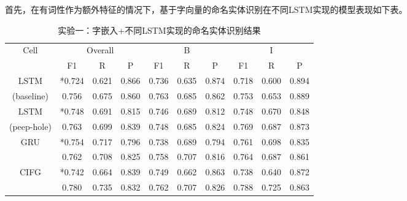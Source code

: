 首先，在有词性作为额外特征的情况下，基于字向量的命名实体识别在不同LSTM实现的模型表现如下表。
\begin{table}[H]
    \centering
    \caption{实验一：字嵌入+不同LSTM实现的命名实体识别结果}
    \begin{tabular}{cccccccccc}
        \toprule
            \multirow{2}{*}{Cell} &\multicolumn{3}{c}{Overall} &\multicolumn{3}{c}{B} &\multicolumn{3}{c}{I}\\
            \cmidrule(lr){2-4} \cmidrule(lr){5-7} \cmidrule(lr){8-10}
            & F1 & R & P & F1 & R & P & F1 & R & P\\
        \midrule
            LSTM & *0.724 & 0.621 & 0.866 & 0.736 & 0.635 & 0.874 & 0.718 & 0.600 & 0.894\\
            (baseline) & 0.756 & 0.675 & 0.860 & 0.763 & 0.685 & 0.862 & 0.753 & 0.653 & 0.889\\
            LSTM & *0.748 & 0.691 & 0.815 & 0.746 & 0.689 & 0.812 & 0.748 & 0.670 & 0.848\\
            (peep-hole) & 0.763 & 0.699 & 0.839 & 0.748 & 0.685 & 0.824 & 0.769 & 0.687 & 0.873\\
            \multirow{2}{2cm}{GRU} & *0.754 & 0.717 & 0.796 & 0.738 & 0.689 & 0.794 & 0.761 & 0.698 & 0.835\\
                                 & 0.762 & 0.708 & 0.825 & 0.758 & 0.707 & 0.816 & 0.764 & 0.687 & 0.861\\
            \multirow{2}{2cm}{CIFG} & *0.742 & 0.664 & 0.839 & 0.749 & 0.662 & 0.863 & 0.738 & 0.640 & 0.872\\
                                  & 0.780 & 0.735 & 0.832 & 0.762 & 0.707 & 0.826 & 0.788 & 0.725 & 0.863\\
        \bottomrule
    \end{tabular}
    \label{tab:tab1}
\end{table}

